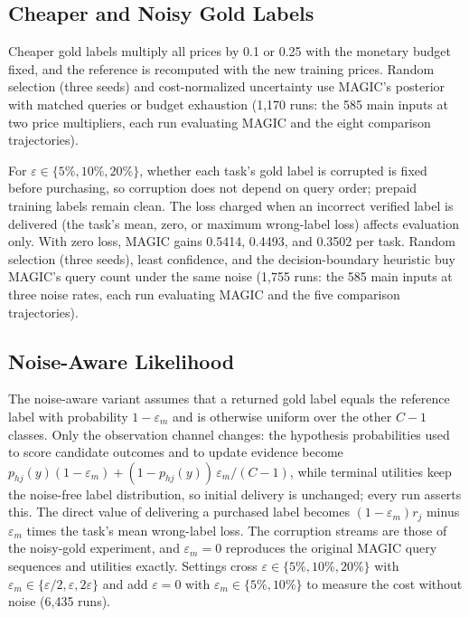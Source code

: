 \documentclass[journal]{IEEEtran}
\begin{document}
\subsection{Cheaper and Noisy Gold Labels}
Cheaper gold labels multiply all prices by 0.1 or 0.25 with the monetary budget fixed, and the reference is recomputed with the new training prices. Random selection (three seeds) and cost-normalized uncertainty use MAGIC's posterior with matched queries or budget exhaustion (1,170 runs: the 585 main inputs at two price multipliers, each run evaluating MAGIC and the eight comparison trajectories).

For $\varepsilon\in\{5\%,10\%,20\%\}$, whether each task's gold label is corrupted is fixed before purchasing, so corruption does not depend on query order; prepaid training labels remain clean. The loss charged when an incorrect verified label is delivered (the task's mean, zero, or maximum wrong-label loss) affects evaluation only. With zero loss, MAGIC gains 0.5414, 0.4493, and 0.3502 per task. Random selection (three seeds), least confidence, and the decision-boundary heuristic buy MAGIC's query count under the same noise (1,755 runs: the 585 main inputs at three noise rates, each run evaluating MAGIC and the five comparison trajectories).

\subsection{Noise-Aware Likelihood}
The noise-aware variant assumes that a returned gold label equals the reference label with probability $1-\varepsilon_m$ and is otherwise uniform over the other $C-1$ classes. Only the observation channel changes: the hypothesis probabilities used to score candidate outcomes and to update evidence become $p_{hj}(y)(1-\varepsilon_m)+(1-p_{hj}(y))\,\varepsilon_m/(C-1)$, while terminal utilities keep the noise-free label distribution, so initial delivery is unchanged; every run asserts this. The direct value of delivering a purchased label becomes $(1-\varepsilon_m)r_j$ minus $\varepsilon_m$ times the task's mean wrong-label loss. The corruption streams are those of the noisy-gold experiment, and $\varepsilon_m=0$ reproduces the original MAGIC query sequences and utilities exactly. Settings cross $\varepsilon\in\{5\%,10\%,20\%\}$ with $\varepsilon_m\in\{\varepsilon/2,\varepsilon,2\varepsilon\}$ and add $\varepsilon=0$ with $\varepsilon_m\in\{5\%,10\%\}$ to measure the cost without noise (6,435 runs).
\end{document}

